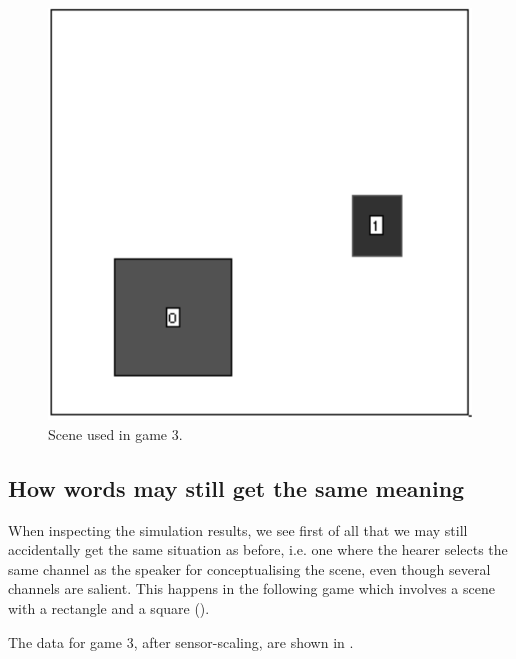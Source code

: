 \begin{figure}[htbp]
  \centerline{\includegraphics[width=.40\textwidth]{chap6/figs/scene-game3}}
\caption{\label{scene-game3} Scene used
in game 3.}
\end{figure}

\subsection{How words may still get the same meaning}

When inspecting the simulation results, we see                          
first of all that 
we may still accidentally get the same situation
as before, i.e. one where the hearer selects 
the same channel as the speaker for conceptualising 
the scene, even though several channels 
are salient. This happens in the
following game which involves a scene with a rectangle
and a square (). 

The data for game 3, after sensor-scaling,
are shown in . 


